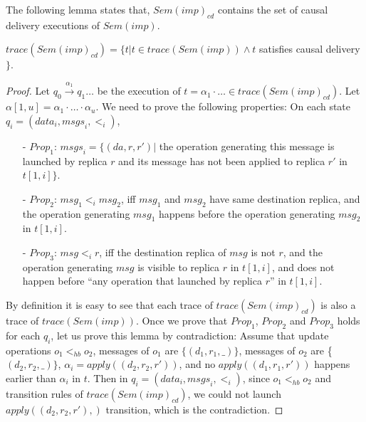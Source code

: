The following lemma states that, $\mathit{Sem}(\mathit{imp})_{\mathit{cd}}$ contains the set of causal delivery executions of $\mathit{Sem}(\mathit{imp})$.

\begin{lemma}
\label{lemma:semantics of imp cd contains the set of causal delivery executions of semantics of imp}
$\mathit{trace}( \mathit{Sem}(\mathit{imp})_{\mathit{cd}} ) = \{ t \vert t \in \mathit{trace}( \mathit{Sem}(\mathit{imp}) ) \wedge t$ satisfies causal delivery $\}$.
\end{lemma}

\begin {proof}

Let $q_0 {\xrightarrow{\alpha_1}} q_1 \ldots$ be the execution of $t = \alpha_1 \cdot \ldots \in \mathit{trace}( \mathit{Sem}(\mathit{imp})_{\mathit{cd}} )$. Let $\alpha[1,u] = \alpha_1 \cdot \ldots \cdot \alpha_u$. We need to prove the following properties: On each state $q_i=(\mathit{data}_i,\mathit{msgs}_i,<_i)$,

\begin{itemize}
\setlength{\itemsep}{0.5pt}
\item[-] $\mathit{Prop}_1$: $\mathit{msgs}_i = \{ (\mathit{da},r,r') \vert$ the operation generating this message is launched by replica $r$ and its message has not been applied to replica $r'$ in $t[1,i]\}$.

\item[-] $\mathit{Prop}_2$: $\mathit{msg}_1 <_i \mathit{msg}_2$, iff $\mathit{msg}_1$ and $\mathit{msg}_2$ have same destination replica, and the operation generating $\mathit{msg}_1$ happens before the operation generating $\mathit{msg}_2$ in $t[1,i]$.

\item[-] $\mathit{Prop}_3$: $\mathit{msg} <_i r$, iff the destination replica of $\mathit{msg}$ is not $r$, and the operation generating $\mathit{msg}$ is visible to replica $r$ in $t[1,i]$, and does not happen before ``any operation that launched by replica $r$'' in $t[1,i]$.
\end{itemize}

By definition it is easy to see that each trace of $\mathit{trace}( \mathit{Sem}(\mathit{imp})_{\mathit{cd}} )$ is also a trace of $\mathit{trace}( \mathit{Sem}(\mathit{imp}) )$. Once we prove that $\mathit{Prop}_1$, $\mathit{Prop}_2$ and $\mathit{Prop}_3$ holds for each $q_i$, let us prove this lemma by contradiction: Assume that update operations $o_1 <_{hb} o_2$, messages of $o_1$ are $\{ (d_1,r_1,\_) \}$, messages of $o_2$ are \{ $(d_2,r_2,\_) \}$, $\alpha_i = apply((d_2,r_2,r'))$, and no $apply((d_1,r_1,r'))$ happens earlier than $\alpha_i$ in $t$. Then in $q_i=(\mathit{data}_i,\mathit{msgs}_i,<_i)$, since $o_1 <_{hb} o_2$ and transition rules of $\mathit{trace}( \mathit{Sem}(\mathit{imp})_{\mathit{cd}} )$, we could not launch $apply((d_2,r_2,r'),)$ transition, which is the contradiction.



\end{proof}
